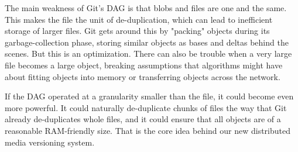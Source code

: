 The main weakness of Git's DAG is that blobs and files are one and the same.
This makes the file the unit of de-duplication, which can lead to inefficient
storage of larger files. Git gets around this by "packing" objects during its
garbage-collection phase, storing similar objects as bases and deltas behind the
scenes. But this is an optimization. There can also be trouble when a very large
file becomes a large object, breaking assumptions that algorithms might have
about fitting objects into memory or transferring objects across the network.

If the DAG operated at a granularity smaller than the file, it could become even
more powerful. It could naturally de-duplicate chunks of files the way that Git
already de-duplicates whole files, and it could ensure that all objects are of a
reasonable RAM-friendly size. That is the core idea behind our new distributed
media versioning system.

